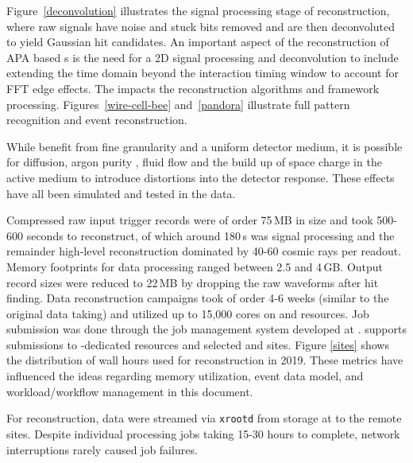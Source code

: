 \documentclass[../main-v1.tex]{subfiles}
\begin{document}
Figure~\ref{deconvolution} illustrates the signal processing stage of reconstruction, where raw  signals have noise and stuck bits removed and are then deconvoluted to yield Gaussian hit candidates. An important aspect of the reconstruction of APA based s is the need for a 2D signal processing and deconvolution to include extending the time domain beyond the interaction timing window to account for FFT edge effects. The impacts the reconstruction algorithms and framework processing. Figures~\ref{wire-cell-bee} and~\ref{pandora} illustrate full pattern recognition and event reconstruction. 

While  benefit from fine granularity and a uniform detector medium, it is possible for diffusion, argon purity , fluid flow and the build up of space charge in the active medium %
to introduce distortions into the detector response.  These effects have all been simulated and tested in the  data. 

Compressed raw input trigger records were of order 75\,MB in size and took 500-600 seconds to reconstruct, of which around 180\,s was signal processing and the remainder high-level reconstruction dominated by 40-60 cosmic rays per readout.  Memory footprints for data processing ranged between 2.5 and 4\,GB.  Output   record sizes were reduced to 22\,MB by dropping the raw waveforms after hit finding.   Data reconstruction campaigns took of order 4-6 weeks (similar to the original data taking) and utilized up to 15,000 cores on  and  resources.  Job submission was done through the \cite{poms} job management system developed at .  supports submissions to -dedicated resources and selected  and  sites.  Figure \ref{sites} shows the distribution of wall hours used for reconstruction in 2019.
These metrics have influenced the ideas regarding memory utilization, event data model, and workload/workflow management in this document.

For reconstruction, data were streamed via {\tt xrootd}\cite{Behrmann:2011zz} from  storage at  to the remote sites. Despite individual processing jobs taking 15-30 hours to complete, network interruptions rarely caused job failures. 
\end{document}

